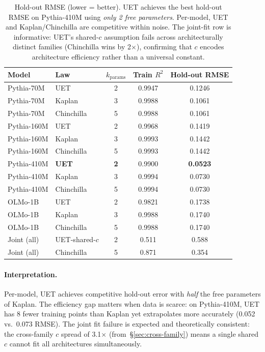\begin{table}[H]
\centering\small
\begin{tabular}{llSSS}
\toprule
Model & Law & {$k_\text{params}$} & {Train $R^2$} & {Hold-out RMSE} \\
\midrule
Pythia-70M  & UET       & 2 & 0.9947 & 0.1246 \\
Pythia-70M  & Kaplan    & 3 & 0.9988 & 0.1061 \\
Pythia-70M  & Chinchilla & 5 & 0.9988 & 0.1061 \\
\midrule
Pythia-160M & UET       & 2 & 0.9968 & 0.1419 \\
Pythia-160M & Kaplan    & 3 & 0.9993 & 0.1442 \\
Pythia-160M & Chinchilla & 5 & 0.9993 & 0.1442 \\
\midrule
Pythia-410M & \textbf{UET}   & \textbf{2} & 0.9900 & \textbf{0.0523} \\
Pythia-410M & Kaplan    & 3 & 0.9994 & 0.0730 \\
Pythia-410M & Chinchilla & 5 & 0.9994 & 0.0730 \\
\midrule
OLMo-1B     & UET       & 2 & 0.9821 & 0.1738 \\
OLMo-1B     & Kaplan    & 3 & 0.9988 & 0.1740 \\
OLMo-1B     & Chinchilla & 5 & 0.9988 & 0.1740 \\
\midrule
Joint (all) & UET-shared-$c$ & 2 & 0.511 & 0.588 \\
Joint (all) & Chinchilla     & 5 & 0.871 & 0.354 \\
\bottomrule
\end{tabular}
\caption{Hold-out RMSE (lower = better). UET achieves the best hold-out RMSE
on Pythia-410M using \emph{only 2 free parameters}.
Per-model, UET and Kaplan/Chinchilla are competitive within noise.
The joint-fit row is informative: UET's shared-$c$ assumption fails across
architecturally distinct families (Chinchilla wins by 2$\times$), confirming
that $c$ encodes architecture efficiency rather than a universal constant.}
\label{tab:predictive}
\end{table}

\paragraph{Interpretation.}
Per-model, UET achieves competitive hold-out error with \emph{half} the free parameters
of Kaplan. The efficiency gap matters when data is scarce: on Pythia-410M, UET has
8 fewer training points than Kaplan yet extrapolates more accurately (0.052 vs.\ 0.073 RMSE).
The joint fit failure is expected and theoretically consistent: the
cross-family $c$ spread of 3.1$\times$ (from~\S\ref{sec:cross-family}) means
a single shared $c$ cannot fit all architectures simultaneously.


